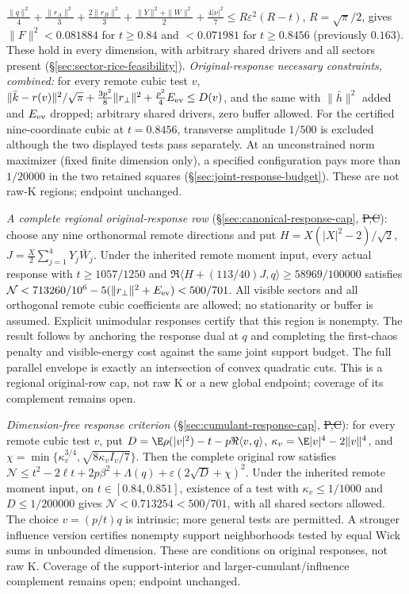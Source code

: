 $\frac{\|q\|^2}4+\frac{\|r_A\|^2}3+\frac{2\|r_B\|^2}3+\frac{\|Y\|^2+\|W\|^2}2+\frac{4|\nu|^2}7\le R\varepsilon^2(R-t)$, $R=\sqrt\pi/2$, gives $\|F\|^2<0.081884$ for $t\ge0.84$ and
$<0.071981$ for $t\ge0.8456$ (previously $0.163$). These hold in every dimension, with arbitrary shared drivers and all sectors present
(\S\ref{sec:sector-rice-feasibility}). \emph{Original-response necessary constraints, combined:} for every remote cubic test $v$,
$\|\bar k-r(v)\|^2/\sqrt\pi+\frac{3p^2}8\|r_\perp\|^2+\frac{p^2}4E_{\rm ev}\le D(v)$, and the same with $\|\bar h\|^2$ added and $E_{\rm ev}$ dropped; arbitrary shared drivers,
zero buffer allowed. For the certified nine-coordinate cubic at $t=0.8456$, transverse amplitude $1/500$ is excluded although the two displayed tests pass separately. At an
unconstrained norm maximizer (fixed finite dimension only), a specified configuration pays more than $1/20000$ in the two retained squares
(\S\ref{sec:joint-response-budget}). These are not raw-K regions; endpoint unchanged.

\emph{A complete regional original-response row} (\S\ref{sec:canonical-response-cap}, \st{P,C}):
choose any nine orthonormal remote directions and put
$H=X(|X|^2-2)/\sqrt2$, $J=\frac X2\sum_{j=1}^4Y_j\bar W_j$.
Under the inherited remote moment input, every actual response with
$t\ge1057/1250$ and $\Re\langle H+(113/40)J,q\rangle\ge58969/100000$
satisfies $\mathcal N<713260/10^6-5(\|r_\perp\|^2+E_{\rm ev})<500/701$.
All visible sectors and all orthogonal remote cubic coefficients are allowed;
no stationarity or buffer is assumed. Explicit unimodular responses certify
that this region is nonempty. The result follows by anchoring the response
dual at $q$ and completing the first-chaos penalty and visible-energy cost
against the same joint support budget. The full parallel envelope is exactly
an intersection of convex quadratic cuts. This is a regional original-row
cap, not raw K or a new global endpoint; coverage of its complement remains open.

\emph{Dimension-free response criterion} (\S\ref{sec:cumulant-response-cap},
\st{P,C}): for every remote cubic test $v$, put
$D=\E\rho(|v|^2)-t-p\Re\langle v,q\rangle$,
$\kappa_v=\E|v|^4-2\|v\|^4$, and
$\chi=\min\{\kappa_v^{3/4},\sqrt{8\kappa_v I_v/7}\}$.
Then the complete original row satisfies
$\mathcal N\le t^2-2\ell t+2p\beta^2+\Lambda(q)
+\varepsilon(2\sqrt D+\chi)^2$.
Under the inherited remote moment input, on $t\in[0.84,0.851]$,
existence of a test with $\kappa_v\le1/1000$ and $D\le1/200000$
gives $\mathcal N<0.713254<500/701$, with all shared sectors allowed.
The choice $v=(p/t)q$ is intrinsic; more general tests are permitted.
A stronger influence version certifies nonempty support neighborhoods
tested by equal Wick sums in unbounded dimension. These are conditions
on original responses, not raw K. Coverage of the support-interior and
larger-cumulant/influence complement remains open; endpoint unchanged.

